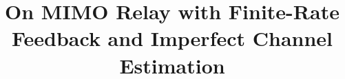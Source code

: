 \documentclass[conference]{IEEEtran}
\begin{document}
%
\title{On MIMO Relay with Finite-Rate Feedback and Imperfect Channel Estimation}





%








\maketitle
\end{document}
